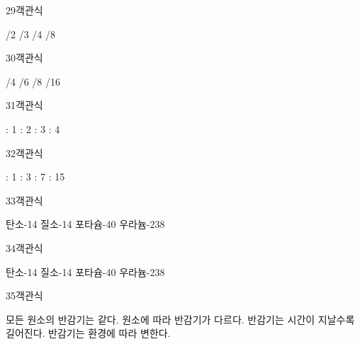 \documentclass[fs9,seriesRus]{korfarm-base}
\begin{document}
\begin{kfQBlock}{29}{객관식}
\begin{kfChoices}
/2
/3
/4
/8
\end{kfChoices}
\end{kfQBlock}
\begin{kfQBlock}{30}{객관식}
\begin{kfChoices}
/4
/6
/8
/16
\end{kfChoices}
\end{kfQBlock}
\begin{kfQBlock}{31}{객관식}
\begin{kfChoices}
 : 1
 : 2
 : 3
 : 4
\end{kfChoices}
\end{kfQBlock}
\begin{kfQBlock}{32}{객관식}
\begin{kfChoices}
 : 1
 : 3
 : 7
 : 15
\end{kfChoices}
\end{kfQBlock}
\begin{kfQBlock}{33}{객관식}
\begin{kfChoices}
\kfChoice 탄소-14
\kfChoice 질소-14
\kfChoice 포타슘-40
\kfChoice 우라늄-238
\end{kfChoices}
\end{kfQBlock}
\begin{kfQBlock}{34}{객관식}
\begin{kfChoices}
\kfChoice 탄소-14
\kfChoice 질소-14
\kfChoice 포타슘-40
\kfChoice 우라늄-238
\end{kfChoices}
\end{kfQBlock}
\begin{kfQBlock}{35}{객관식}
\begin{kfChoices}
\kfChoice 모든 원소의 반감기는 같다.
\kfChoice 원소에 따라 반감기가 다르다.
\kfChoice 반감기는 시간이 지날수록 길어진다.
\kfChoice 반감기는 환경에 따라 변한다.
\end{kfChoices}
\end{kfQBlock}
\end{document}

